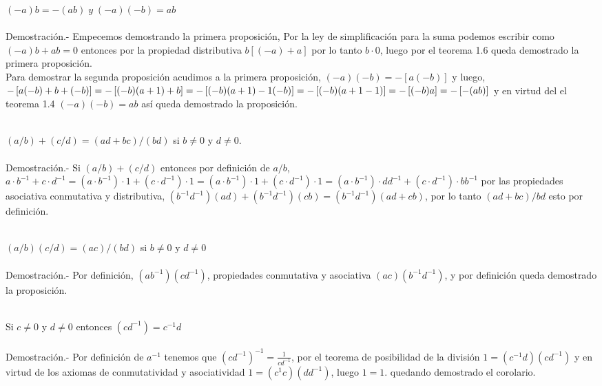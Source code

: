 \begin{enumerate}
\begin{teo}
$(-a)b=-(ab) \; y \; (-a)(-b) = ab$\\\\
Demostración.- \;
Empecemos demostrando la primera proposición, Por la ley de simplificación para la suma podemos escribir como $(-a)b+ab=0$ entonces por la propiedad distributiva $b\left[ (-a)+a \right]$ por lo tanto $b\cdot 0$, luego por el teorema 1.6 queda demostrado la primera proposición.\\
Para demostrar la segunda proposición acudimos a la primera proposición, $(-a)(-b)=-\left[ a(-b)\right]$ y luego, \\ $-\left[ a(-b)+b+(-b)\right]=-\left[ (-b)(a+1)+b\right]=-\left[ (-b)(a+1)-1(-b)\right]=-\left[( -b)(a+1-1)\\\right]=-\left[ (-b)a\right]=-\left[ -(ab)\right]$ y en virtud  del el teorema 1.4 $(-a)(-b)=ab$ así queda demostrado la proposición.  \\\\
\end{teo}

\begin{teo}
$\left(a/b \right) + \left(c/d \right) = \left( ad+bc  \right) / \left( bd \right) $ si $b\neq 0$ y $d\neq 0$.\\\\
Demostración.- \;
Si $\left(a/b \right) + \left(c/d \right)$ entonces por definición de $a/b$, $a\cdot b^{-1}+c\cdot d^{-1}=(a\cdot b^{-1})\cdot 1+(c\cdot d^{-1})\cdot 1=(a\cdot b^{-1})\cdot 1+(c\cdot d^{-1})\cdot 1=(a\cdot b^{-1})\cdot dd^{-1}+(c\cdot d^{-1})\cdot bb^{-1}$ por las propiedades asociativa  conmutativa y distributiva, $(b^{-1}d^{-1})(ad)+(b^{-1}d^{-1})(cb)=(b^{-1}d^{-1})(ad+cb)$, por lo tanto $(ad+bc)/bd$ esto por definición.\\\\
\end{teo}

\begin{teo}
$(a/b)(c/d)=(ac)/(bd)$ si $b\neq 0$ y $d\neq 0$\\\\
Demostración.- \;
Por definición, $(ab^{-1})(cd^{-1})$, propiedades conmutativa y asociativa $(ac)(b^{-1}d^{-1})$, y por definición queda demostrado la proposición.\\\\
\end{teo}

\begin{col.}
Si $c\neq 0$ y $d\neq 0$ entonces $(cd^{-1})=c^{-1}d$\\\\
Demostración.- \;
Por definición de $a^{-1}$ tenemos que $(cd^{-1})^{-1}=\displaystyle\frac{1}{cd^{-1}}$, por el teorema de posibilidad de la división $1=(c^{-1}d)(cd^{-1})$ y en virtud de los axiomas de conmutatividad y asociatividad $1=(c^{1}c)(dd^{-1})$, luego $1=1$. quedando demostrado el corolario.\\\\
\end{col.}


\end{enumerate}

